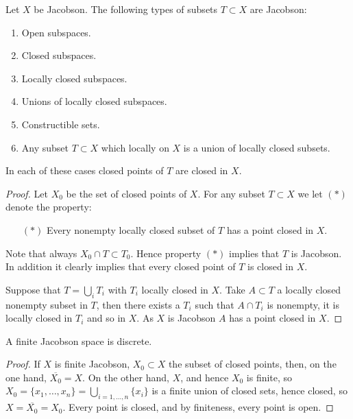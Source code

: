 \begin{lemma}
\label{lemma-jacobson-inherited}
Let $X$ be Jacobson. The following types of subsets $T \subset X$
are Jacobson:
\begin{enumerate}
\item Open subspaces.
\item Closed subspaces.
\item Locally closed subspaces.
\item Unions of locally closed subspaces.
\item Constructible sets.
\item Any subset $T \subset X$ which locally on $X$
is a union of locally closed subsets.
\end{enumerate}
In each of these cases closed points of $T$ are
closed in $X$.
\end{lemma}

\begin{proof}
Let $X_0$ be the set of closed points of $X$. For any subset
$T \subset X$ we let $(*)$ denote the property:
\begin{itemize}
\item[$(*)$] Every nonempty locally closed subset of $T$ has a point
closed in $X$.
\end{itemize}
Note that always $X_0 \cap T \subset T_0$. Hence property $(*)$
implies that $T$ is Jacobson. In addition it clearly implies
that every closed point of $T$ is closed in $X$.

\medskip\noindent
Suppose that $T=\bigcup_i T_i$ with $T_i$ locally closed in $X$.
Take $A\subset T$ a locally closed nonempty subset in $T$,
then there exists a $T_i$ such that $A\cap T_i$ is nonempty, it is
locally closed in $T_i$ and so in $X$.
As $X$ is Jacobson $A$ has a point closed in $X$.
\end{proof}

\begin{lemma}
\label{lemma-finite-jacobson}
A finite Jacobson space is discrete.
\end{lemma}

\begin{proof}
If $X$ is finite Jacobson, $X_0 \subset X$ the subset of closed points,
then, on the one hand, $\overline{X_0} = X$. On the other hand, $X$,
and hence $X_0$ is finite, so
$X_0 =\{x_1, \ldots, x_n\} = \bigcup_{i = 1, \ldots, n} \{x_i\}$
is a finite union of closed sets, hence closed, so
$X = \overline{X_0} = X_0$. Every point is closed, and by
finiteness, every point is open.
\end{proof}

